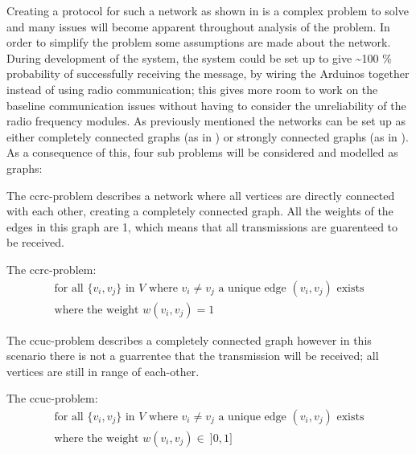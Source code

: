 Creating a protocol for such a network as shown in  is a complex problem to solve and many issues will become apparent throughout analysis of the problem.
In order to simplify the problem some assumptions are made about the network.
During development of the system, the system could be set up to give \textasciitilde100 \% probability of successfully receiving the message, by wiring the Arduinos together instead of using radio communication; this gives more room to work on the baseline communication issues without having to consider the unreliability of the radio frequency modules.
As previously mentioned the networks can be set up as either completely connected graphs (as in ) or strongly connected graphs (as in ).
As a consequence of this, four sub problems will be considered and modelled as graphs:

\bigskip

\noindent The \gls{ccrc}-problem describes a network where all vertices are directly connected with each other, creating a completely connected graph.
All the weights of the edges in this graph are 1, which means that all transmissions are guarenteed to be received. 	

\begin{definition}
	The \acrshort{ccrc}-problem:
	\begin{align*}
		\text{for all } \{v_i, v_j\} \text{ in } V \text{ where } v_i \neq v_j \text{ a unique edge } (v_i, v_j) \text{ exists}\\
		\text{where the weight } w(v_i, v_j) = 1
	\end{align*}
\end{definition}

\noindent The \gls{ccuc}-problem describes a completely connected graph however in this scenario there is not a guarrentee that the transmission will be received; all vertices are still in range of each-other.

\begin{definition}
	The \acrshort{ccuc}-problem:
	\begin{align*}
		\text{for all } \{v_i, v_j\} \text{ in } V \text{ where } v_i \neq v_j \text{ a unique edge } (v_i, v_j) \text{ exists}\\
		\text{where the weight } w(v_i, v_j) \in\ ]0, 1]
	\end{align*}
\end{definition} 

